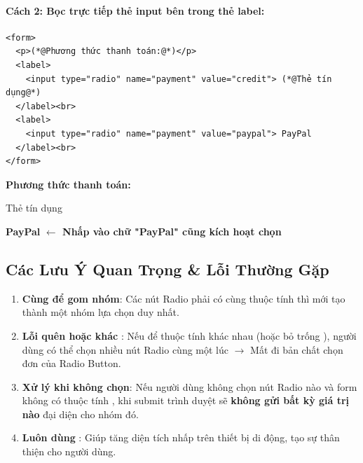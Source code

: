 \paragraph{Cách 2: Bọc trực tiếp thẻ input bên trong thẻ label:}
\begin{codeWindow}
\begin{lstlisting}[language=HTML5]
<form>
  <p>(*@Phương thức thanh toán:@*)</p>
  <label>
    <input type="radio" name="payment" value="credit"> (*@Thẻ tín dụng@*)
  </label><br>
  <label>
    <input type="radio" name="payment" value="paypal"> PayPal
  </label><br>
</form>
\end{lstlisting}
\end{codeWindow}

\begin{browserWindow}
\sffamily\small
\textbf{Phương thức thanh toán:} \\[6pt]
 \; Thẻ tín dụng \\[4pt]
 \; \textbf{PayPal} \quad \textcolor{primaryBlue}{\small\textbf{$\leftarrow$ Nhấp vào chữ "PayPal" cũng kích hoạt chọn}}
\end{browserWindow}

\subsection{Các Lưu Ý Quan Trọng \& Lỗi Thường Gặp}

\begin{warnBox}
\begin{enumerate}[leftmargin=1.5em, itemsep=3pt, parsep=0pt]
    \item \textbf{Cùng  để gom nhóm}: Các nút Radio phải có cùng thuộc tính  thì mới tạo thành một nhóm lựa chọn duy nhất.
    \item \textbf{Lỗi quên  hoặc khác }: Nếu để thuộc tính  khác nhau (hoặc bỏ trống ), người dùng có thể chọn nhiều nút Radio cùng một lúc $\rightarrow$ Mất đi bản chất chọn đơn của Radio Button.
    \item \textbf{Xử lý khi không chọn}: Nếu người dùng không chọn nút Radio nào và form không có thuộc tính , khi submit trình duyệt sẽ \textbf{không gửi bất kỳ giá trị nào} đại diện cho nhóm đó.
    \item \textbf{Luôn dùng }: Giúp tăng diện tích nhấp trên thiết bị di động, tạo sự thân thiện cho người dùng.
\end{enumerate}
\end{warnBox}


